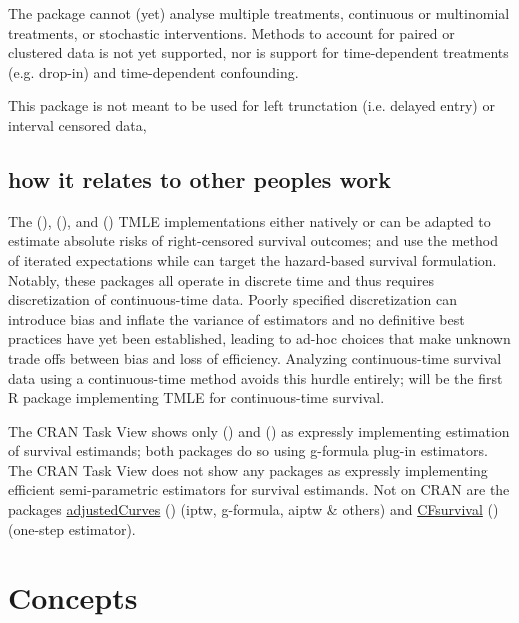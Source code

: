 \documentclass{report}
\newcommand{\1}{\ensuremath{\mathbf{1}}}
\begin{document}
The package cannot (yet) analyse multiple treatments, continuous or multinomial treatments, or stochastic interventions. Methods to account for paired or clustered data is not yet supported, nor is support for time-dependent treatments (e.g. drop-in) and time-dependent confounding.

This package is not meant to be used for left trunctation (i.e. delayed entry) or interval censored data, 

\subsection{how it relates to other peoples work}
\label{sec:org766121b}

The  (\cite{schwab_ltmle_2020}),  (\cite{sofrygin_stremr_2017}), and  (\cite{benkeser_survtmle_2019}) TMLE implementations either natively or can be adapted to estimate absolute risks of right-censored survival outcomes;  and  use the method of iterated expectations while  can target the hazard-based survival formulation. Notably, these packages all operate in discrete time and thus requires discretization of continuous-time data. Poorly specified discretization can introduce bias and inflate the variance of estimators and no definitive best practices have yet been established, leading to ad-hoc choices that make unknown trade offs between bias and loss of efficiency. Analyzing continuous-time survival data using a continuous-time method avoids this hurdle entirely;  will be the first R package implementing TMLE for continuous-time survival.

The  CRAN Task View shows only  (\cite{gerds_riskregression_2022}) and  (\cite{wallace_dtrreg_2020}) as expressly implementing estimation of survival estimands; both packages do so using g-formula plug-in estimators. The  CRAN Task View does not show any packages as expressly implementing efficient semi-parametric estimators for survival estimands. Not on CRAN are the packages \href{https://github.com/RobinDenz1/adjustedCurves}{adjustedCurves} (\cite{denz_comparison_2022}) (iptw, g-formula, aiptw \& others) and \href{https://github.com/tedwestling/CFsurvival}{CFsurvival} (\cite{westling_inference_2021}) (one-step estimator). 


\section{Concepts}
\label{sec:org7e113a3}
\end{document}

